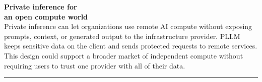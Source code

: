 \documentclass[10pt,letterpaper]{article}
\begin{document}
\thispagestyle{fancy}

\begin{minipage}[t]{\textwidth}
{\fontsize{26}{27}\selectfont\bfseries Private inference for\\an open compute world}\\[7pt]
{\fontsize{11}{14}\selectfont\color{pllmMuted} Private inference can let organizations use remote AI compute without exposing prompts, context, or generated output to the infrastructure provider. PLLM keeps sensitive data on the client and sends protected requests to remote services. This design could support a broader market of independent compute without requiring users to trust one provider with all of their data.}
\end{minipage}

\vspace{8pt}\textcolor{pllmLine}{\rule{\textwidth}{.6pt}}\vspace{5pt}
\end{document}
